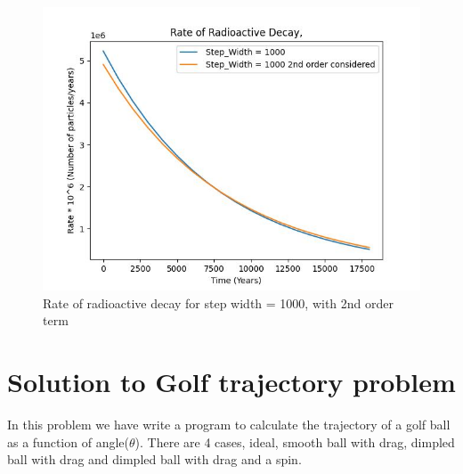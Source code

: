 \documentclass[11pt]{article}
\begin{document}
\begin{justify}
\begin{figure}[b]
    \centering
    \includegraphics[width=\textwidth, height=\textheight, keepaspectratio]{Carbon_plot_1000_with 2nd order.jpeg}
    \caption{Rate of radioactive decay for step width = 1000, with 2nd order term}
    \label{fig:Rate of radioactive decay for step width = 1000, with 2nd order term}
\end{figure}


\section{Solution to Golf trajectory problem}
In this problem we have write a program to calculate the trajectory of a golf ball as a function of angle($\theta$). There are 4 cases, ideal, smooth ball with drag, dimpled ball with drag and dimpled ball with drag and a spin.

\end{justify}
\end{document}
